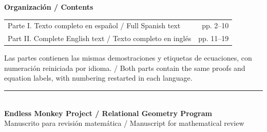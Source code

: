 \documentclass[11pt,a4paper]{article}
\begin{document}
\vspace{5pt}
{\bfseries\color{ink}Organización / Contents}\par\vspace{5pt}
\begin{tabularx}{\linewidth}{@{}Xr@{}}
Parte I. Texto completo en español / Full Spanish text & pp. 2--10\\[4pt]
Part II. Complete English text / Texto completo en inglés & pp. 11--19\\[4pt]
\end{tabularx}
\vspace{7pt}
{\footnotesize\color{slate}
Las partes contienen las mismas demostraciones y etiquetas de ecuaciones, con numeración reiniciada por idioma. / Both parts contain the same proofs and equation labels, with numbering restarted in each language.}
\vfill
{\color{ink}\rule{\linewidth}{.5pt}}\\[7pt]
{\small\bfseries Endless Monkey Project / Relational Geometry Program}\\[3pt]
{\footnotesize\color{slate}Manuscrito para revisión matemática / Manuscript for mathematical review}
\end{document}
